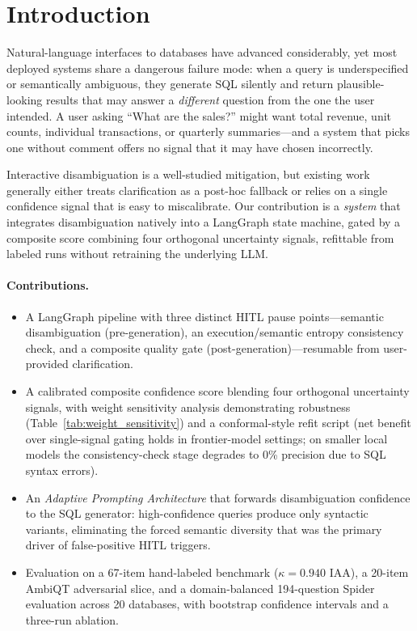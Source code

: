 \documentclass{article}
\begin{document}
\section{Introduction}
\label{sec:intro}

Natural-language interfaces to databases have advanced considerably, yet most
deployed systems share a dangerous failure mode: when a query is underspecified
or semantically ambiguous, they generate SQL silently and return
plausible-looking results that may answer a \emph{different} question from the
one the user intended.
A user asking ``What are the sales?'' might want total revenue, unit counts,
individual transactions, or quarterly summaries---and a system that picks one
without comment offers no signal that it may have chosen incorrectly.

Interactive disambiguation is a well-studied mitigation, but existing
work~\citep{nl2sql_survey,ambiqt} generally either treats clarification as a
post-hoc fallback or relies on a single confidence signal that is easy to
miscalibrate.
Our contribution is a \emph{system} that integrates disambiguation natively
into a LangGraph state machine, gated by a composite score combining four
orthogonal uncertainty signals, refittable from labeled runs without
retraining the underlying LLM.

\paragraph{Contributions.}
\begin{itemize}
  \item A LangGraph pipeline with three distinct HITL pause points---semantic
        disambiguation (pre-generation), an execution/semantic entropy
        consistency check, and a composite quality gate
        (post-generation)---resumable from user-provided clarification.
  \item A calibrated composite confidence score blending four orthogonal
        uncertainty signals, with weight sensitivity analysis demonstrating
        robustness (Table~\ref{tab:weight_sensitivity}) and a conformal-style
        refit script (net benefit over single-signal gating holds in
        frontier-model settings; on smaller local models the consistency-check
        stage degrades to 0\% precision due to SQL syntax errors).
  \item An \emph{Adaptive Prompting Architecture} that forwards disambiguation
        confidence to the SQL generator: high-confidence queries produce only
        syntactic variants, eliminating the forced semantic diversity that was
        the primary driver of false-positive HITL triggers.
  \item Evaluation on a 67-item hand-labeled benchmark ($\kappa{=}0.940$ IAA),
        a 20-item AmbiQT adversarial slice, and a domain-balanced 194-question
        Spider evaluation across 20 databases, with bootstrap confidence
        intervals and a three-run ablation.
\end{itemize}
\end{document}
